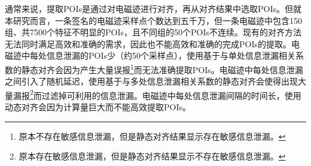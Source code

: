 {{{	
%	
%	
}
	
	通常来说，提取POIs是通过对电磁迹进行对齐，再从对齐结果中选取POIs。但就本研究而言，一条签名的电磁迹采样点个数达到五千万，但一条电磁迹中包含150组、共7500个特征不明显的POIs，且不同组的50个POIs不连续。现有的对齐方法无法同时满足高效和准确的需求，因此也不能高效和准确的完成POIs的提取。电磁迹中每处信息泄漏的POIs少（约50个采样点），使用基于与单处信息泄漏相关系数的静态对齐会因为产生大量误报\footnote{原本不存在敏感信息泄漏，但是静态对齐结果显示存在敏感信息泄漏。}而无法准确提取POIs。电磁迹中每处信息泄漏之间引入了随机延迟，使用基于与多处信息泄漏相关系数的静态对齐会使得出现大量漏报\footnote{原本存在敏感信息泄漏，但是静态对齐结果显示不存在敏感信息泄漏。}而过滤掉可利用的信息泄漏。电磁迹中每处信息泄漏间隔的时间长，使用动态对齐会因为计算量巨大而不能高效提取POIs。
	
}}
